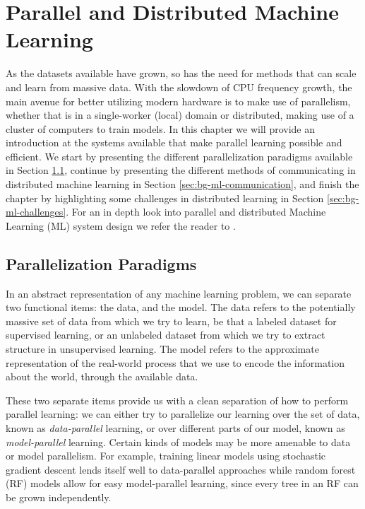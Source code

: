\chapter{Parallel and Distributed Machine Learning}

As the datasets available have grown, so has the need for methods that
can scale and learn from massive data. With the slowdown of CPU frequency
growth, the main avenue for better utilizing modern hardware is to make use
of parallelism, whether that is in a single-worker (local) domain or distributed,
making use of a cluster of computers to train models. In this chapter we
will provide an introduction at the systems available that make
parallel learning possible and efficient. We start by presenting the
different parallelization paradigms available in Section \ref{sec:bg-ml-paradigms},
continue by presenting the different methods of communicating in
distributed machine learning in Section \ref{sec:bg-ml-communication},
and finish the chapter by highlighting some challenges in
distributed learning in Section \ref{sec:bg-ml-challenges}.
For an in depth look into parallel and distributed Machine Learning (ML)
system design we refer the reader to \cite{distributed-ml-design}.

\section{Parallelization Paradigms}
\label{sec:bg-ml-paradigms}

In an abstract representation of any machine learning problem, we can separate
two functional items: the data, and the model. The data refers to the potentially
massive set of data from which we try to learn, be that a labeled dataset for
supervised learning, or an unlabeled dataset from which we try to extract
structure in unsupervised learning. The model refers to the approximate representation
of the real-world process that we use to encode the information about the world,
through the available data.

These two separate items provide us with a clean separation of how to perform
parallel learning: we can either try to parallelize our learning over the set
of data, known as \emph{data-parallel} learning, or over different parts of
our model, known as \emph{model-parallel} learning. Certain kinds of models
may be more amenable to data or model parallelism. For example, training
linear models using stochastic gradient descent lends itself well to
data-parallel approaches \cite{dekel-optimal-distributed} while random
forest (RF) models allow for easy model-parallel learning,
since every tree in an RF can be grown independently.

